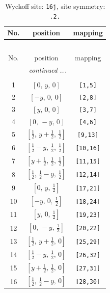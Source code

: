 \documentclass[fleqn,8pt]{jsarticle}
\begin{document}
\renewcommand{\arraystretch}{1.2}
\begin{longtable}{ccc}
\caption{Wyckoff site: {\tt 16j}, site symmetry: {\tt .2.}}
 \\
 \hline \hline
No. & position & mapping \\ \hline \endfirsthead

\multicolumn{2}{l}{\tablename\ \thetable{}} \\
 \hline \hline
No. & position & mapping \\ \hline \endhead

 \hline \hline
\multicolumn{2}{r}{\footnotesize\it continued ...} \\ \endfoot

 \hline \hline
\multicolumn{2}{r}{} \\ \endlastfoot

1 & $\left[ 0,\, y,\, 0 \right]$ & {\tt [1,5]} \\ \hline
2 & $\left[ - y,\, 0,\, 0 \right]$ & {\tt [2,8]} \\ \hline
3 & $\left[ y,\, 0,\, 0 \right]$ & {\tt [3,7]} \\ \hline
4 & $\left[ 0,\, - y,\, 0 \right]$ & {\tt [4,6]} \\ \hline
5 & $\left[ \frac{1}{2},\, y + \frac{1}{2},\, \frac{1}{2} \right]$ & {\tt [9,13]} \\ \hline
6 & $\left[ \frac{1}{2} - y,\, \frac{1}{2},\, \frac{1}{2} \right]$ & {\tt [10,16]} \\ \hline
7 & $\left[ y + \frac{1}{2},\, \frac{1}{2},\, \frac{1}{2} \right]$ & {\tt [11,15]} \\ \hline
8 & $\left[ \frac{1}{2},\, \frac{1}{2} - y,\, \frac{1}{2} \right]$ & {\tt [12,14]} \\ \hline
9 & $\left[ 0,\, y,\, \frac{1}{2} \right]$ & {\tt [17,21]} \\ \hline
10 & $\left[ - y,\, 0,\, \frac{1}{2} \right]$ & {\tt [18,24]} \\ \hline
11 & $\left[ y,\, 0,\, \frac{1}{2} \right]$ & {\tt [19,23]} \\ \hline
12 & $\left[ 0,\, - y,\, \frac{1}{2} \right]$ & {\tt [20,22]} \\ \hline
13 & $\left[ \frac{1}{2},\, y + \frac{1}{2},\, 0 \right]$ & {\tt [25,29]} \\ \hline
14 & $\left[ \frac{1}{2} - y,\, \frac{1}{2},\, 0 \right]$ & {\tt [26,32]} \\ \hline
15 & $\left[ y + \frac{1}{2},\, \frac{1}{2},\, 0 \right]$ & {\tt [27,31]} \\ \hline
16 & $\left[ \frac{1}{2},\, \frac{1}{2} - y,\, 0 \right]$ & {\tt [28,30]} \\
\end{longtable}
\end{document}
